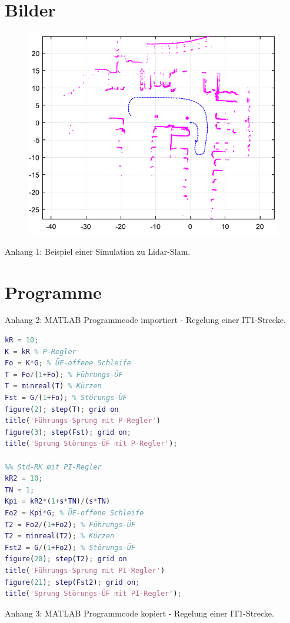 \appendix

\section{Bilder}

\begin{figure}[H]
    \centering
    \includegraphics[scale=0.5]{30_Ende/SLAM.png}
\end{figure}
\label{anhang:PNGBILD}
Anhang 1: Beispiel einer Simulation zu Lidar-Slam.

\section{Programme}


\label{anhang:Matlabcode1}
Anhang 2: MATLAB Programmcode importiert - Regelung einer IT1-Strecke.

\newpage
\begin{lstlisting}[language=Matlab]
%% Std-Regelkreis mit P-Regler
kR = 10;
K = kR % P-Regler
Fo = K*G; % ÜF-offene Schleife
T = Fo/(1+Fo); % Führungs-ÜF
T = minreal(T) % Kürzen
Fst = G/(1+Fo); % Störungs-ÜF
figure(2); step(T); grid on
title('Führungs-Sprung mit P-Regler')
figure(3); step(Fst); grid on;
title('Sprung Störungs-ÜF mit P-Regler');

%% Std-RK mit PI-Regler
kR2 = 10;
TN = 1;
Kpi = kR2*(1+s*TN)/(s*TN)
Fo2 = Kpi*G; % ÜF-offene Schleife
T2 = Fo2/(1+Fo2); % Führungs-ÜF
T2 = minreal(T2); % Kürzen
Fst2 = G/(1+Fo2); % Störungs-ÜF
figure(20); step(T2); grid on
title('Führungs-Sprung mit PI-Regler')
figure(21); step(Fst2); grid on;
title('Sprung Störungs-ÜF mit PI-Regler');
\end{lstlisting}
\label{anhang:Matlabcode2}
Anhang 3: MATLAB Programmcode kopiert - Regelung einer IT1-Strecke.